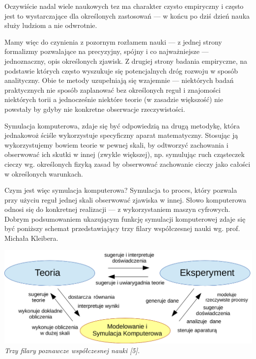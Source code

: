 \par{
Oczywiście nadal wiele naukowych tez ma charakter czysto empiryczny i często jest to wystarczające dla określonych zastosowań --- w końcu po dziś dzień nauka służy ludziom a nie odwrotnie.
}

\par{
Mamy więc do czynienia z pozornym rozłamem nauki --- z jednej strony formalizmy pozwalające na precyzyjny, spójny i co najważniejsze --- jednoznaczny, opis określonych zjawisk. Z drugiej strony badania empiryczne, na podstawie których często wyszukuje się potencjalnych dróg rozwoju w sposób analityczny. Obie te metody uzupełniają się wzajemnie --- niektórych badań praktycznych nie sposób zaplanować bez określonych reguł i znajomości niektórych torii a jednocześnie niektóre teorie (w zasadzie większość) nie powstały by gdyby nie konkretne obserwacje rzeczywistości.
}

\par{
Symulacja komputerowa, zdaje się być odpowiedzią na drugą metodykę, która jednakowoż ściśle wykorzystuje specyficzny aparat matematyczny. Stosując ją wykorzystujemy bowiem teorie w pewnej skali, by odtworzyć zachowania i obserwować ich skutki w innej (zwykle większej), np. symulując ruch cząsteczek cieczy wg. określonych fizyką zasad by obserwować zachowanie cieczy jako całości w określonych warunkach.
}

\par{
Czym jest więc symulacja komputerowa? Symulacja to proces, który pozwala przy użyciu reguł jednej skali obserwować zjawiska w innej. Słowo komputerowa odnosi się do konkretnej realizacji --- z wykorzystaniem maszyn cyfrowych. Dobrym podsumowaniem ukazującym funkcję symulacji komputerowej zdaje się być poniższy schemat przedstawiający trzy filary współczesnej nauki wg. prof. Michała Kleibera.
\begin{center}
\includegraphics[width=\textwidth,keepaspectratio]{img/triada_poznania}
\textit{Trzy filary poznawcze współczesnej nauki [5].}
\end{center}
}

